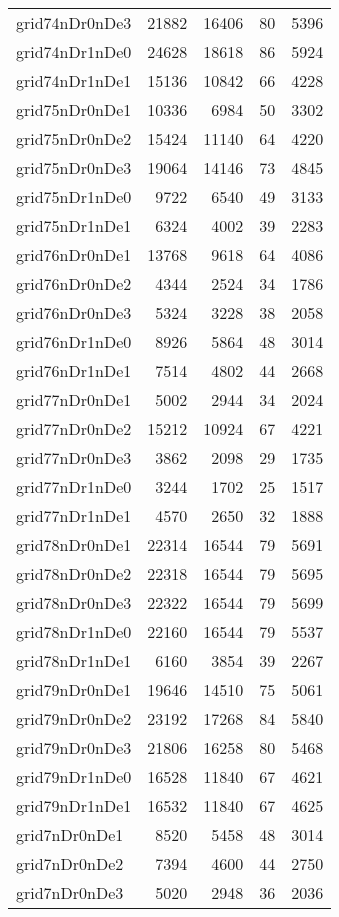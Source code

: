 \begin{longtable}{lrrrr}
grid74nDr0nDe3 & 21882 & 16406 & 80 & 5396 \\
grid74nDr1nDe0 & 24628 & 18618 & 86 & 5924 \\
grid74nDr1nDe1 & 15136 & 10842 & 66 & 4228 \\
grid75nDr0nDe1 & 10336 & 6984 & 50 & 3302 \\
grid75nDr0nDe2 & 15424 & 11140 & 64 & 4220 \\
grid75nDr0nDe3 & 19064 & 14146 & 73 & 4845 \\
grid75nDr1nDe0 & 9722 & 6540 & 49 & 3133 \\
grid75nDr1nDe1 & 6324 & 4002 & 39 & 2283 \\
grid76nDr0nDe1 & 13768 & 9618 & 64 & 4086 \\
grid76nDr0nDe2 & 4344 & 2524 & 34 & 1786 \\
grid76nDr0nDe3 & 5324 & 3228 & 38 & 2058 \\
grid76nDr1nDe0 & 8926 & 5864 & 48 & 3014 \\
grid76nDr1nDe1 & 7514 & 4802 & 44 & 2668 \\
grid77nDr0nDe1 & 5002 & 2944 & 34 & 2024 \\
grid77nDr0nDe2 & 15212 & 10924 & 67 & 4221 \\
grid77nDr0nDe3 & 3862 & 2098 & 29 & 1735 \\
grid77nDr1nDe0 & 3244 & 1702 & 25 & 1517 \\
grid77nDr1nDe1 & 4570 & 2650 & 32 & 1888 \\
grid78nDr0nDe1 & 22314 & 16544 & 79 & 5691 \\
grid78nDr0nDe2 & 22318 & 16544 & 79 & 5695 \\
grid78nDr0nDe3 & 22322 & 16544 & 79 & 5699 \\
grid78nDr1nDe0 & 22160 & 16544 & 79 & 5537 \\
grid78nDr1nDe1 & 6160 & 3854 & 39 & 2267 \\
grid79nDr0nDe1 & 19646 & 14510 & 75 & 5061 \\
grid79nDr0nDe2 & 23192 & 17268 & 84 & 5840 \\
grid79nDr0nDe3 & 21806 & 16258 & 80 & 5468 \\
grid79nDr1nDe0 & 16528 & 11840 & 67 & 4621 \\
grid79nDr1nDe1 & 16532 & 11840 & 67 & 4625 \\
grid7nDr0nDe1 & 8520 & 5458 & 48 & 3014 \\
grid7nDr0nDe2 & 7394 & 4600 & 44 & 2750 \\
grid7nDr0nDe3 & 5020 & 2948 & 36 & 2036 \\

\end{longtable}

